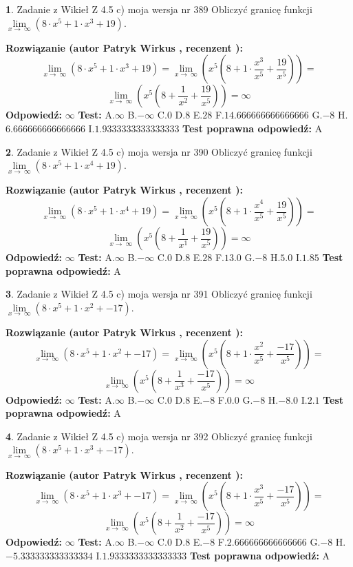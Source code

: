 \documentclass[12pt, a4paper]{article}
\theoremstyle{definition} %
\newtheorem{zad}{}
\newcommand{\zadStart}[1]{\begin{zad}#1\newline}
\newcommand{\zadStop}{\end{zad}}
\newcommand{\rozwStart}[2]{\noindent \textbf{Rozwiązanie (autor #1 , recenzent #2): }\newline}
\newcommand{\rozwStop}{\newline}
\newcommand{\odpStart}{\noindent \textbf{Odpowiedź:}\newline}
\newcommand{\odpStop}{\newline}
\newcommand{\testStart}{\noindent \textbf{Test:}\newline}
\newcommand{\testStop}{\newline}
\newcommand{\kluczStart}{\noindent \textbf{Test poprawna odpowiedź:}\newline}
\newcommand{\kluczStop}{\newline}
\begin{document}
\zadStart{Zadanie z Wikieł Z 4.5 c) moja wersja nr 389}
Obliczyć granicę funkcji  $\lim\limits_{x\to\ \infty}(8 \cdot x^{5}+1 \cdot x^{3}+19)$.
\zadStop
\rozwStart{Patryk Wirkus}{}
$$\lim\limits_{x\to\ \infty}(8 \cdot x^{5}+1 \cdot x^{3}+19) = \lim\limits_{x\to\ \infty}(x^{5}(8 +1 \cdot \frac{x^{3}}{x^{5}}+\frac{19}{x^{5}})) =$$ $$\lim\limits_{x\to\ \infty}(x^{5}(8 +\frac{1}{x^{2}}+\frac{19}{x^{5}})) =\infty$$
\rozwStop
\odpStart
$\infty$
\odpStop
\testStart
A.$\infty$ B.$-\infty$ C.$0$ D.$8$ E.$28$
F.$14.666666666666666$ G.$-8$
H.$6.666666666666666$
I.$1.9333333333333333$
\testStop
\kluczStart
A
\kluczStop



\zadStart{Zadanie z Wikieł Z 4.5 c) moja wersja nr 390}
Obliczyć granicę funkcji  $\lim\limits_{x\to\ \infty}(8 \cdot x^{5}+1 \cdot x^{4}+19)$.
\zadStop
\rozwStart{Patryk Wirkus}{}
$$\lim\limits_{x\to\ \infty}(8 \cdot x^{5}+1 \cdot x^{4}+19) = \lim\limits_{x\to\ \infty}(x^{5}(8 +1 \cdot \frac{x^{4}}{x^{5}}+\frac{19}{x^{5}})) =$$ $$\lim\limits_{x\to\ \infty}(x^{5}(8 +\frac{1}{x^{1}}+\frac{19}{x^{5}})) =\infty$$
\rozwStop
\odpStart
$\infty$
\odpStop
\testStart
A.$\infty$ B.$-\infty$ C.$0$ D.$8$ E.$28$
F.$13.0$ G.$-8$
H.$5.0$
I.$1.85$
\testStop
\kluczStart
A
\kluczStop



\zadStart{Zadanie z Wikieł Z 4.5 c) moja wersja nr 391}
Obliczyć granicę funkcji  $\lim\limits_{x\to\ \infty}(8 \cdot x^{5}+1 \cdot x^{2}+-17)$.
\zadStop
\rozwStart{Patryk Wirkus}{}
$$\lim\limits_{x\to\ \infty}(8 \cdot x^{5}+1 \cdot x^{2}+-17) = \lim\limits_{x\to\ \infty}(x^{5}(8 +1 \cdot \frac{x^{2}}{x^{5}}+\frac{-17}{x^{5}})) =$$ $$\lim\limits_{x\to\ \infty}(x^{5}(8 +\frac{1}{x^{3}}+\frac{-17}{x^{5}})) =\infty$$
\rozwStop
\odpStart
$\infty$
\odpStop
\testStart
A.$\infty$ B.$-\infty$ C.$0$ D.$8$ E.$-8$
F.$0.0$ G.$-8$
H.$-8.0$
I.$2.1$
\testStop
\kluczStart
A
\kluczStop



\zadStart{Zadanie z Wikieł Z 4.5 c) moja wersja nr 392}
Obliczyć granicę funkcji  $\lim\limits_{x\to\ \infty}(8 \cdot x^{5}+1 \cdot x^{3}+-17)$.
\zadStop
\rozwStart{Patryk Wirkus}{}
$$\lim\limits_{x\to\ \infty}(8 \cdot x^{5}+1 \cdot x^{3}+-17) = \lim\limits_{x\to\ \infty}(x^{5}(8 +1 \cdot \frac{x^{3}}{x^{5}}+\frac{-17}{x^{5}})) =$$ $$\lim\limits_{x\to\ \infty}(x^{5}(8 +\frac{1}{x^{2}}+\frac{-17}{x^{5}})) =\infty$$
\rozwStop
\odpStart
$\infty$
\odpStop
\testStart
A.$\infty$ B.$-\infty$ C.$0$ D.$8$ E.$-8$
F.$2.666666666666666$ G.$-8$
H.$-5.333333333333334$
I.$1.9333333333333333$
\testStop
\kluczStart
A
\kluczStop
\end{document}
